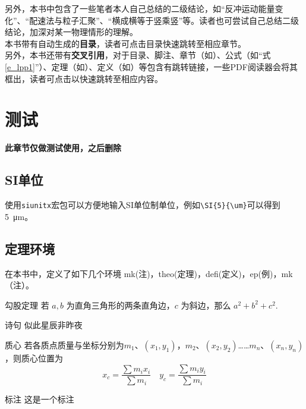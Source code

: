 \documentclass{gbook}
\begin{document}
另外，本书中包含了一些笔者本人自己总结的二级结论，如“反冲运动能量变化”、“配速法与粒子汇聚”、“横成横等于竖乘竖”等。读者也可尝试自己总结二级结论，加深对某一物理情形的理解。
~\\

本书带有自动生成的\textbf{目录}，读者可点击目录快速跳转至相应章节。
~\\

另外，本书还带有\textbf{交叉引用}，对于目录、脚注、章节（如）、公式（如“式\eqref{e_lpp1}”）、定理（如）、定义（如）等包含有跳转链接，一些PDF阅读器会将其框出，读者可点击以快速跳转至相应内容。

\newpage


\setcounter{page}{1}

\tableofcontents

\newpage

\setcounter{page}{1}










\chapter{测试}

\textbf{此章节仅做测试使用，之后删除}

\section{SI单位}

使用\verb+siunitx+宏包可以方便地输入SI单位制单位，例如\verb+\SI{5}{\um}+可以得到\SI{5}{\um}。

\section{定理环境}

在本书中，定义了如下几个环境
mk(注)，theo(定理)，defi(定义)，ep(例)，mk（注）。

\begin{theo}{勾股定理}{}
若 $a,b$ 为直角三角形的两条直角边，$c$ 为斜边，那么 $a^2 + b^2 + c^2.$
\end{theo}

\begin{ep}{诗句}{}
似此星辰非昨夜
\end{ep}

\begin{defi}{质心}{}
若各质点质量与坐标分别为$m_1$、$(x_1,y_1)$，$m_2$、$(x_2,y_2)$……$m_n$、$(x_n,y_n)$，则质心位置为
$$x_c = \frac{\sum m_i x_i}{\sum m_i} \quad y_c = \frac{\sum m_i y_i}{\sum m_i}$$
\end{defi}

\begin{mk}{标注}{}
这是一个标注
\end{mk}
\end{document}
